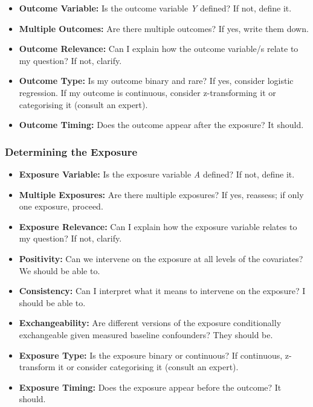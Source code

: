 \documentclass[
  singlecolumn]{article}
\providecommand{\tightlist}{%
  \setlength{\itemsep}{0pt}\setlength{\parskip}{0pt}}\usepackage{longtable,booktabs,array}
\begin{document}
\begin{itemize}
\tightlist
\item
  \textbf{Outcome Variable:} Is the outcome variable \emph{Y} defined?
  If not, define it.
\item
  \textbf{Multiple Outcomes:} Are there multiple outcomes? If yes, write
  them down.
\item
  \textbf{Outcome Relevance:} Can I explain how the outcome variable/s
  relate to my question? If not, clarify.
\item
  \textbf{Outcome Type:} Is my outcome binary and rare? If yes, consider
  logistic regression. If my outcome is continuous, consider
  z-transforming it or categorising it (consult an expert).
\item
  \textbf{Outcome Timing:} Does the outcome appear after the exposure?
  It should.
\end{itemize}

\hypertarget{determining-the-exposure}{%
\subsubsection{Determining the
Exposure}\label{determining-the-exposure}}

\begin{itemize}
\tightlist
\item
  \textbf{Exposure Variable:} Is the exposure variable \emph{A} defined?
  If not, define it.
\item
  \textbf{Multiple Exposures:} Are there multiple exposures? If yes,
  reassess; if only one exposure, proceed.
\item
  \textbf{Exposure Relevance:} Can I explain how the exposure variable
  relates to my question? If not, clarify.
\item
  \textbf{Positivity:} Can we intervene on the exposure at all levels of
  the covariates? We should be able to.
\item
  \textbf{Consistency:} Can I interpret what it means to intervene on
  the exposure? I should be able to.
\item
  \textbf{Exchangeability:} Are different versions of the exposure
  conditionally exchangeable given measured baseline confounders? They
  should be.
\item
  \textbf{Exposure Type:} Is the exposure binary or continuous? If
  continuous, z-transform it or consider categorising it (consult an
  expert).
\item
  \textbf{Exposure Timing:} Does the exposure appear before the outcome?
  It should.
\end{itemize}
\end{document}
